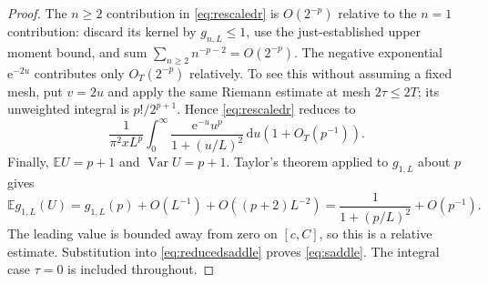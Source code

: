 \documentclass[11pt,a4paper]{article}
\theoremstyle{definition}
\theoremstyle{remark}
\newcommand{\e}{\mathrm e}
\newcommand{\dd}{\,\mathrm d}
\begin{document}
\begin{proof}
The $n\ge2$ contribution in \eqref{eq:rescaledr} is
$O(2^{-p})$ relative to the $n=1$ contribution: discard its kernel by
$g_{n,L}\le1$, use the just-established upper moment bound, and sum
$\sum_{n\ge2}n^{-p-2}=O(2^{-p})$. The negative exponential
$\e^{-2u}$ contributes only $O_T(2^{-p})$ relatively. To see this without
assuming a fixed mesh, put $v=2u$ and apply the same Riemann estimate at
mesh $2\tau\le2T$; its unweighted integral is $p!/2^{p+1}$.
Hence \eqref{eq:rescaledr} reduces to
\begin{equation}
 \frac1{\pi^2xL^p}\int_0^\infty
       \frac{\e^{-u}u^p}{1+(u/L)^2}\dd u
       \left(1+O_T(p^{-1})\right).
 \label{eq:reducedsaddle}
\end{equation}
Finally, $\mathbb EU=p+1$ and $\operatorname{Var}U=p+1$.
Taylor's theorem applied to $g_{1,L}$ about $p$ gives
\[
 \mathbb E g_{1,L}(U)
 =g_{1,L}(p)+O(L^{-1})+O((p+2)L^{-2})
 =\frac1{1+(p/L)^2}+O(p^{-1}).
\]
The leading value is bounded away from zero on $[c,C]$, so this is a
relative estimate. Substitution into \eqref{eq:reducedsaddle} proves
\eqref{eq:saddle}. The integral case $\tau=0$ is included throughout.
\end{proof}
\end{document}
